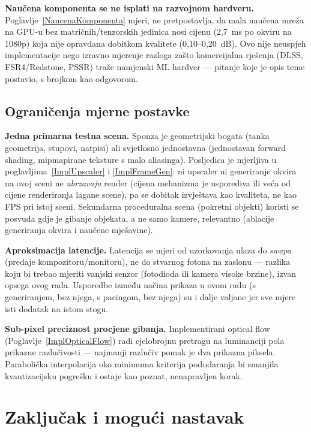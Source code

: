 \documentclass{mathos}
\begin{document}
\textbf{Naučena komponenta se ne isplati na razvojnom hardveru.}
Poglavlje~\ref{NaucenaKomponenta} mjeri, ne pretpostavlja, da mala naučena
mreža na GPU-u bez matričnih/tenzorskih jedinica nosi cijenu (2,7~ms po
okviru na 1080p) koja nije opravdana dobitkom kvalitete (0,10--0,20~dB).
Ovo nije neuspjeh implementacije nego izravno mjerenje razloga zašto
komercijalna rješenja (DLSS, FSR4/Redstone, PSSR) traže namjenski ML
hardver — pitanje koje je opis teme postavio, s brojkom kao odgovorom.

\section{Ograničenja mjerne postavke}

\textbf{Jedna primarna testna scena.} Sponza je geometrijski bogata (tanka
geometrija, stupovi, natpisi) ali svjetlosno jednostavna (jednostavan
forward shading, mipmapirane teksture s malo aliasinga). Posljedica je
mjerljiva u poglavljima~\ref{ImplUpscaler} i \ref{ImplFrameGen}: ni
upscaler ni generiranje okvira na ovoj sceni ne \emph{ubrzavaju} render
(cijena mehanizma je usporediva ili veća od cijene renderiranja lagane
scene), pa se dobitak izvještava kao kvaliteta, ne kao FPS pri istoj sceni.
Sekundarna proceduralna scena (pokretni objekti) koristi se posvuda gdje je
gibanje objekata, a ne samo kamere, relevantno (ablacije generiranja okvira
i naučene mješavine).

\textbf{Aproksimacija latencije.} Latencija se mjeri od uzorkovanja ulaza do
\emph{swapa} (predaje kompozitoru/monitoru), ne do stvarnog fotona na
zaslonu — razlika koju bi trebao mjeriti vanjski senzor (fotodioda ili
kamera visoke brzine), izvan opsega ovog rada. Usporedbe između načina
prikaza u ovom radu (s generiranjem, bez njega, s pacingom, bez njega) su
i dalje valjane jer sve mjere isti dodatak na istom stogu.

\textbf{Sub-pixel preciznost procjene gibanja.} Implementirani optical flow
(Poglavlje~\ref{ImplOpticalFlow}) radi cjelobrojnu pretragu na luminanciji
pola prikazne razlučivosti — najmanji razlučiv pomak je dva prikazna
piksela. Parabolička interpolacija oko minimuma kriterija podudaranja bi
smanjila kvantizacijsku pogrešku i ostaje kao poznat, nenapravljen korak.


\chapter{Zaključak i mogući nastavak}\label{Zakljucak}
\end{document}
